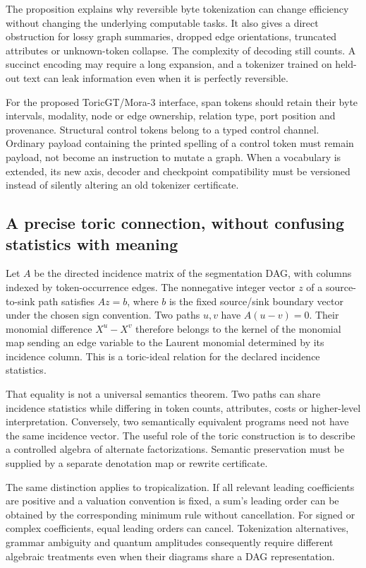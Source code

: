 The proposition explains why reversible byte tokenization can change efficiency without changing the underlying computable tasks. It also gives a direct obstruction for lossy graph summaries, dropped edge orientations, truncated attributes or unknown-token collapse. The complexity of decoding still counts. A succinct encoding may require a long expansion, and a tokenizer trained on held-out text can leak information even when it is perfectly reversible.

For the proposed ToricGT/Mora-3 interface, span tokens should retain their byte intervals, modality, node or edge ownership, relation type, port position and provenance. Structural control tokens belong to a typed control channel. Ordinary payload containing the printed spelling of a control token must remain payload, not become an instruction to mutate a graph. When a vocabulary is extended, its new axis, decoder and checkpoint compatibility must be versioned instead of silently altering an old tokenizer certificate.

\subsection{A precise toric connection, without confusing statistics with meaning}

Let $A$ be the directed incidence matrix of the segmentation DAG, with columns indexed by token-occurrence edges. The nonnegative integer vector $z$ of a source-to-sink path satisfies $Az=b$, where $b$ is the fixed source/sink boundary vector under the chosen sign convention. Two paths $u,v$ have $A(u-v)=0$. Their monomial difference $X^u-X^v$ therefore belongs to the kernel of the monomial map sending an edge variable to the Laurent monomial determined by its incidence column. This is a toric-ideal relation for the declared incidence statistics.

That equality is not a universal semantics theorem. Two paths can share incidence statistics while differing in token counts, attributes, costs or higher-level interpretation. Conversely, two semantically equivalent programs need not have the same incidence vector. The useful role of the toric construction is to describe a controlled algebra of alternate factorizations. Semantic preservation must be supplied by a separate denotation map or rewrite certificate.

The same distinction applies to tropicalization. If all relevant leading coefficients are positive and a valuation convention is fixed, a sum's leading order can be obtained by the corresponding minimum rule without cancellation. For signed or complex coefficients, equal leading orders can cancel. Tokenization alternatives, grammar ambiguity and quantum amplitudes consequently require different algebraic treatments even when their diagrams share a DAG representation.

